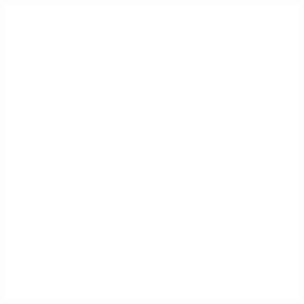 \begin{changemargin}{0em}{0.1\linewidth}
%
\hspace{0.2\linewidth}\includegraphics[scale=0.8]{emptyphoto.png}


\end{changemargin}
